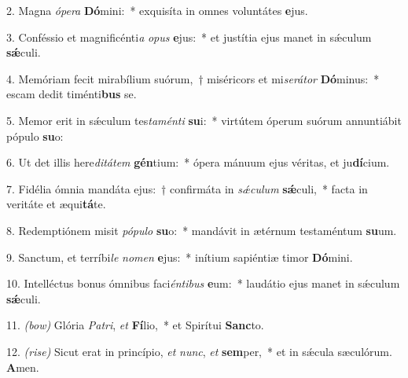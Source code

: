 2. Magna \textit{ó}\textit{pe}\textit{ra} \textbf{Dó}mini:~* exquisíta in omnes voluntátes \textbf{e}jus.

3. Conféssio et magnificénti\textit{a} \textit{o}\textit{pus} \textbf{e}jus:~* et justítia ejus manet in sǽculum \textbf{sǽ}culi.

4. Memóriam fecit mirabílium suórum,~† miséricors et mi\textit{se}\textit{rá}\textit{tor} \textbf{Dó}minus:~* escam dedit timénti\textbf{bus} se.

5. Memor erit in sǽculum tes\textit{ta}\textit{mén}\textit{ti} \textbf{su}i:~* virtútem óperum suórum annuntiábit pópulo \textbf{su}o:

6. Ut det illis here\textit{di}\textit{tá}\textit{tem} \textbf{gén}tium:~* ópera mánuum ejus véritas, et ju\textbf{dí}cium.

7. Fidélia ómnia mandáta ejus:~† confirmáta in \textit{sǽ}\textit{cu}\textit{lum} \textbf{sǽ}culi,~* facta in veritáte et æqui\textbf{tá}te.

8. Redemptiónem misit \textit{pó}\textit{pu}\textit{lo} \textbf{su}o:~* mandávit in ætérnum testaméntum \textbf{su}um.

9. Sanctum, et terríbi\textit{le} \textit{no}\textit{men} \textbf{e}jus:~* inítium sapiéntiæ timor \textbf{Dó}mini.

10. Intelléctus bonus ómnibus faci\textit{én}\textit{ti}\textit{bus} \textbf{e}um:~* laudátio ejus manet in sǽculum \textbf{sǽ}culi.

11. \textit{(bow)} Glória \textit{Pa}\textit{tri}, \textit{et} \textbf{Fí}lio,~* et Spirítui \textbf{Sanc}to.

12. \textit{(rise)} Sicut erat in princípio, \textit{et} \textit{nunc}, \textit{et} \textbf{sem}per,~* et in sǽcula sæculórum. \textbf{A}men.